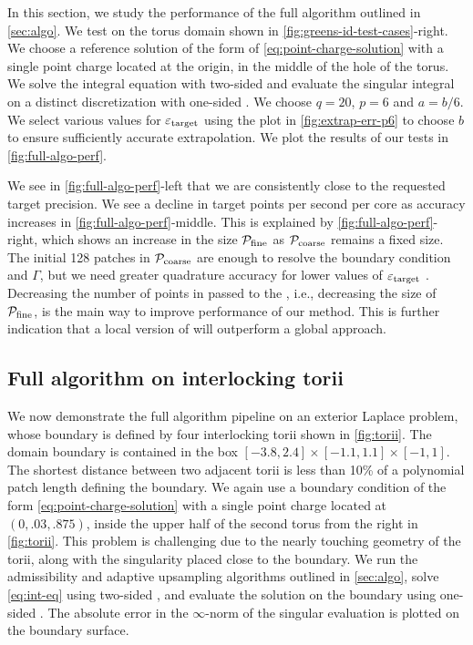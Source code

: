 In this section, we study the performance of the full algorithm outlined in \cref{sec:algo}.
We test \qbkix on the torus domain shown in \cref{fig:greens-id-test-cases}-right.
We choose a reference solution of the form of \cref{eq:point-charge-solution} with a single point charge located at the origin, in the middle of the hole of the torus.
We solve the integral equation with two-sided \qbkix and evaluate the singular integral on a distinct discretization with one-sided \qbkix.
We choose $q=20$, $p=6$ and $a=b/6$.
We select various values for ${\varepsilon_{\mathrm{target}}}$ using the plot in \cref{fig:extrap-err-p6} to choose $b$ to ensure sufficiently accurate extrapolation. 
We plot the results of our tests in \cref{fig:full-algo-perf}.

We see in \cref{fig:full-algo-perf}-left that we are consistently close to the requested target precision. 
We see a decline in target points per second per core as accuracy increases in \cref{fig:full-algo-perf}-middle.
This is explained by \cref{fig:full-algo-perf}-right, which shows an increase in the size ${\mathcal{P}_{\mathrm{fine}}}$ as ${\mathcal{P}_{\mathrm{coarse}}}$ remains a fixed size.
The initial 128 patches in ${\mathcal{P}_{\mathrm{coarse}}}$ are enough to resolve the boundary condition and $\Gamma$, but we need greater quadrature accuracy for lower values of ${\varepsilon_{\mathrm{target}}}$ .
Decreasing the number of points in passed to the \fmm, i.e., decreasing the size of ${\mathcal{P}_{\mathrm{fine}}}$, is the main way to improve performance of our method.
This is further indication that a local version of \qbkix will outperform a global approach.

\subsection{Full algorithm on interlocking torii\label{sec:results-torii}}
We now demonstrate the full algorithm pipeline on an exterior Laplace problem, whose boundary is defined by four interlocking torii shown in \cref{fig:torii}.
The domain boundary is contained in the box $[-3.8, 2.4] \times [-1.1, 1.1] \times [-1,1]$.
The shortest distance between two adjacent torii is less than 10\% of a polynomial patch length defining the boundary.
We again use a boundary condition of the form \cref{eq:point-charge-solution} with a single point charge located at $(0,.03,.875)$, inside the upper half of the second torus from the right in \cref{fig:torii}.
This problem is challenging due to the nearly touching geometry of the torii, along with the singularity placed close to the boundary.
We run the admissibility and adaptive upsampling algorithms outlined in \cref{sec:algo}, solve \cref{eq:int-eq} using two-sided \qbkix, and evaluate the solution on the boundary using one-sided \qbkix.
The absolute error in the $\infty$-norm of the singular evaluation is plotted on the boundary surface.


